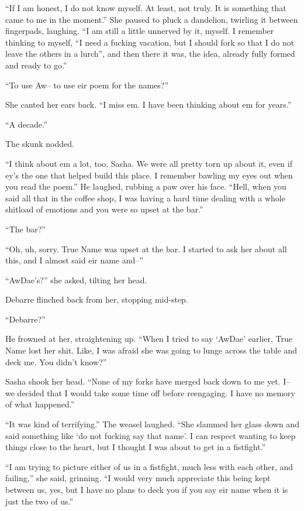 ``If I am honest, I do not know myself. At least, not truly. It is something that came to me in the moment.'' She paused to pluck a dandelion, twirling it between fingerpads, laughing. ``I am still a little unnerved by it, myself. I remember thinking to myself, ``I need a fucking vacation, but I should fork so that I do not leave the others in a lurch'', and then there it was, the idea, already fully formed and ready to go.''

``To use Aw-- to use eir poem for the names?''

She canted her ears back. ``I miss em. I have been thinking about em for years.''

``A decade.''

The skunk nodded.

``I think about em a lot, too, Sasha. We were all pretty torn up about it, even if ey's the one that helped build this place. I remember bawling my eyes out when you read the poem.'' He laughed, rubbing a paw over his face. ``Hell, when you said all that in the coffee shop, I was having a hard time dealing with a whole shitload of emotions and you were so upset at the bar.''

``The bar?''

``Oh, uh, sorry. True Name was upset at the bar. I started to ask her about all this, and I almost said eir name and--''

``AwDae's?'' she asked, tilting her head.

Debarre flinched back from her, stopping mid-step.

``Debarre?''

He frowned at her, straightening up. ``When I tried to say `AwDae' earlier, True Name lost her shit. Like, I was afraid she was going to lunge across the table and deck me. You didn't know?''

Sasha shook her head. ``None of my forks have merged back down to me yet. I-- we decided that I would take some time off before reengaging. I have no memory of what happened.''

``It was kind of terrifying.'' The weasel laughed. ``She slammed her glass down and said something like `do not fucking say that name'. I can respect wanting to keep things close to the heart, but I thought I was about to get in a fistfight.''

``I am trying to picture either of us in a fistfight, much less with each other, and failing,'' she said, grinning. ``I would very much appreciate this being kept between us, yes, but I have no plans to deck you if you say eir name when it is just the two of us.''

